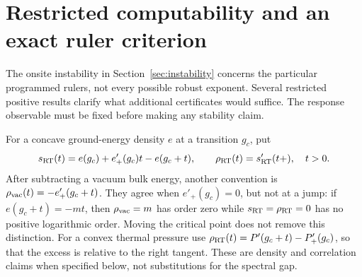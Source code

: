 \section{Restricted computability and an exact ruler criterion}
\label{sec:restricted}
The onsite instability in Section~\ref{sec:instability} concerns the
particular programmed rulers, not every possible robust exponent.
Several restricted positive results clarify what additional
certificates would suffice. The response observable must be fixed
before making any stability claim.

For a concave ground-energy density $e$ at a transition $g_c$, put
\[
 s_{\rm RT}(t)=e(g_c)+e'_+(g_c)t-e(g_c+t),\qquad
 \rho_{\rm RT}(t)=s'_{\rm RT}(t+),\quad t>0.
\]
After subtracting a vacuum bulk energy, another convention is
$\rho_{\rm vac}(t)=-e'_+(g_c+t)$. They agree when $e'_+(g_c)=0$,
but not at a jump: if $e(g_c+t)=-mt$, then
$\rho_{\rm vac}=m$ has order zero while
$s_{\rm RT}=\rho_{\rm RT}=0$ has no positive logarithmic order.
Moving the critical point does not remove this distinction.
For a convex thermal pressure use
$\rho_{\rm RT}(t)=P'(g_c+t)-P'_+(g_c)$, so that the excess is
relative to the right tangent. These are density and correlation
claims when specified below, not substitutions for the spectral gap.

